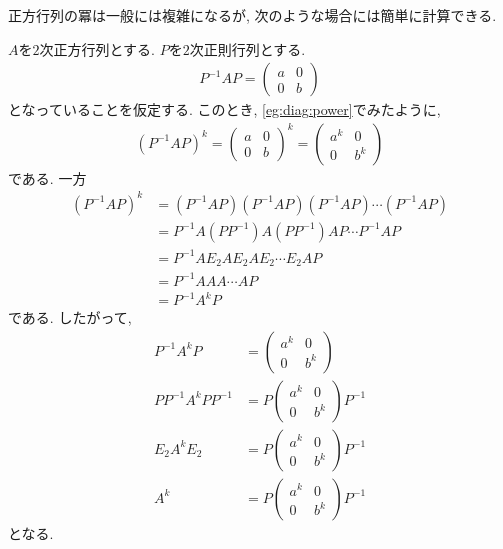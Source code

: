 正方行列の冪は一般には複雑になるが,
次のような場合には簡単に計算できる.
\begin{example}
  \label{ex:diagonalizedpow}
  $A$を$2$次正方行列とする.
  $P$を$2$次正則行列とする.
  \begin{align*}
    P^{-1}AP=
    \begin{pmatrix}
      a&0\\
      0&b
      \end{pmatrix}
  \end{align*}
  となっていることを仮定する.
  このとき,
  \cref{eg:diag:power}でみたように,
  \begin{align*}
    (P^{-1}AP)^k=
    \begin{pmatrix}
      a&0\\
      0&b
    \end{pmatrix}^k
    =
    \begin{pmatrix}
      a^k&0\\
      0&b^k
      \end{pmatrix}
  \end{align*}
  である. 一方
  \begin{align*}
    (P^{-1}AP)^k
    &= (P^{-1}AP)(P^{-1}AP)(P^{-1}AP)\cdots (P^{-1}AP)\\
    &= P^{-1}A(PP^{-1})A(PP^{-1})AP\cdots P^{-1}AP\\
    &= P^{-1}AE_2AE_2AE_2\cdots E_2AP\\
    &= P^{-1}AAA\cdots AP\\
    &= P^{-1}A^k P
  \end{align*}
  である.
  したがって,
  \begin{align*}
   P^{-1}A^k P&=
    \begin{pmatrix}
      a^k&0\\
      0&b^k
    \end{pmatrix}
    \\
   PP^{-1}A^k PP^{-1}&=
   P \begin{pmatrix}
      a^k&0\\
      0&b^k
    \end{pmatrix}P^{-1}
  \\
   E_2A^k E_2&=
   P \begin{pmatrix}
      a^k&0\\
      0&b^k
    \end{pmatrix}P^{-1}
  \\
   A^k &=
   P \begin{pmatrix}
      a^k&0\\
      0&b^k
    \end{pmatrix}P^{-1}
  \end{align*}
  となる.
\end{example}

